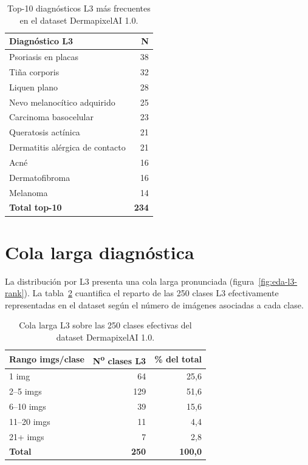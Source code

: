 \begin{table}[H]
\centering
\small
\caption{Top-10 diagnósticos L3 más frecuentes en el dataset
DermapixelAI 1.0.}
\label{tab:anexo-top10-l3}
\begin{tabular}{lr}
\hline
Diagnóstico L3                          & N    \\
\hline
Psoriasis en placas                     & 38   \\
Tiña corporis                           & 32   \\
Liquen plano                            & 28   \\
Nevo melanocítico adquirido             & 25   \\
Carcinoma basocelular                   & 23   \\
Queratosis actínica                     & 21   \\
Dermatitis alérgica de contacto         & 21   \\
Acné                                    & 16   \\
Dermatofibroma                          & 16   \\
Melanoma                                & 14   \\
\hline
\textbf{Total top-10}                   & \textbf{234} \\
\hline
\end{tabular}
\end{table}

\section{Cola larga diagnóstica}
\label{sec:anexo-long-tail}

La distribución por L3 presenta una cola larga pronunciada
(figura~\ref{fig:eda-l3-rank}). La
tabla~\ref{tab:anexo-cola-larga} cuantifica el reparto de las 250
clases L3 efectivamente representadas en el dataset según el número
de imágenes asociadas a cada clase.

\begin{table}[H]
\centering
\footnotesize
\caption{Cola larga L3 sobre las 250 clases efectivas del dataset
DermapixelAI 1.0.}
\label{tab:anexo-cola-larga}
\begin{tabular}{lrr}
\hline
Rango imgs/clase & N\textsuperscript{o} clases L3 & \% del total \\
\hline
1 img       & 64  & 25,6  \\
2--5 imgs   & 129 & 51,6  \\
6--10 imgs  & 39  & 15,6  \\
11--20 imgs & 11  & 4,4   \\
21+ imgs    & 7   & 2,8   \\
\hline
\textbf{Total} & \textbf{250} & \textbf{100,0} \\
\hline
\end{tabular}
\end{table}

